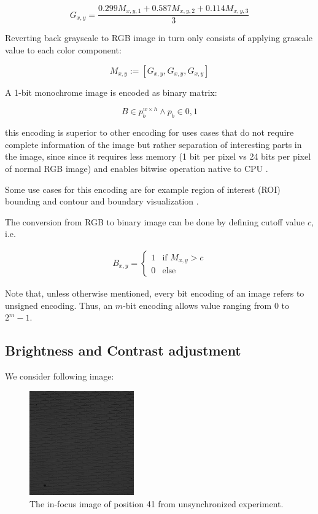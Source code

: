\documentclass[pdftex,12pt,a4paper]{report}
\begin{document}
\begin{equation}
\label{equation:rgb_to_gray_def}
G_{x, y} = \frac{0.299 M_{x, y, 1} + 0.587  M_{x, y, 2} + 0.114 M_{x, y, 3}}{3}
\end{equation}

Reverting back grayscale to RGB image in turn only consists of applying grascale value to each color component:

$$
M_{x, y} := [G_{x, y}, G_{x, y}, G_{x, y}]
$$

A 1-bit monochrome image is encoded as binary matrix:

$$
B \in p_b^{w \times h} \land p_b \in {0, 1}
$$

this encoding is superior to other encoding for uses cases that do not require complete information of the image but rather separation of interesting parts in the image, since since it requires less memory (1 bit per pixel vs 24 bits per pixel of normal RGB image) and enables bitwise operation native to CPU \cite{kernighan1988c}. 

Some use cases for this encoding are for example region of interest (ROI) bounding and contour and boundary visualization \cite{hartley2003multiple}.

The conversion from RGB to binary image can be done by defining cutoff value $c$, i.e.

\begin{gather*}
B_{x, y} =
\begin{cases}
  1 & \text{if } M_{x, y} > c\\    
  0 & \text{else}  
\end{cases}
\end{gather*}

Note that, unless otherwise mentioned, every bit encoding of an image refers to unsigned encoding. Thus, an $m$-bit encoding allows value ranging from $0$ to $2^m - 1$.

\subsection{Brightness and Contrast adjustment}

We consider following image: 

\begin{figure}[H]
\centering
\includegraphics[width=0.4\textwidth]{images/pos_41_in_t0}
\caption{The in-focus image of position 41 from unsynchronized experiment.}
\label{fig:pos41}
\end{figure}
\end{document}
